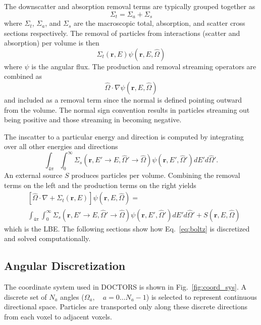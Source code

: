 The downscatter and absorption removal terms are typically grouped together as
\begin{equation}
\Sigma_t = \Sigma_a + \Sigma_s
\end{equation}
where $\Sigma_t$, $\Sigma_a$, and $\Sigma_s$ are the macroscopic total, absorption, and scatter cross sections respectively. The removal of particles from interactions (scatter and absorption) per volume is then
\begin{equation}
\Sigma_t(\boldsymbol{r}, E) \psi(\boldsymbol{r}, E, \hat{\Omega})
\end{equation}
where $\psi$ is the angular flux. The production and removal streaming operators are combined as 
\begin{equation}
\hat{\Omega} \cdot \nabla \psi(\boldsymbol{r}, E, \hat{\Omega})
\end{equation}
and included as a removal term since the normal is defined pointing outward from the volume. The normal sign convention results in particles streaming out being positive and those streaming in becoming negative. 

The inscatter to a particular energy and direction is computed by integrating over all other energies and directions
\begin{equation}
\int_{4\pi}^{} \int_{0}^{\infty} \Sigma_s(\boldsymbol{r}, E' \rightarrow E, \hat{\Omega}' \rightarrow \hat{\Omega}) \psi(\boldsymbol{r}, E', \hat{\Omega}') dE' d\hat{\Omega}'.
\end{equation}
An external source $S$ produces particles per volume. Combining the removal terms on the left and the production terms on the right yields
\begin{equation} \label{eq:boltz}
\begin{split}
	&\left[ \hat{\Omega} \cdot \nabla + \Sigma_t(\boldsymbol{r}, E) \right]
	\psi(\boldsymbol{r}, E, \hat{\Omega}) = \\
	&\int_{4 \pi} \int_0^\infty \Sigma_s(\boldsymbol{r}, E' \rightarrow E, \hat{\Omega}' \rightarrow \hat{\Omega}) \psi(\boldsymbol{r}, E', \hat{\Omega}') dE' d\hat{\Omega}' + S(\boldsymbol{r}, E, \hat{\Omega})
\end{split}
\end{equation}
which is the LBE. The following sections show how Eq.~\ref{eq:boltz} is discretized and solved computationally.

\subsection{Angular Discretization}
The coordinate system used in DOCTORS is shown in Fig.~\ref{fig:coord_sys}. A discrete set of $N_a$ angles ($\Omega_{a}, \quad a = 0 \ldots N_a-1$) is selected to represent continuous directional space. Particles are transported only along these discrete directions from each voxel to adjacent voxels.

